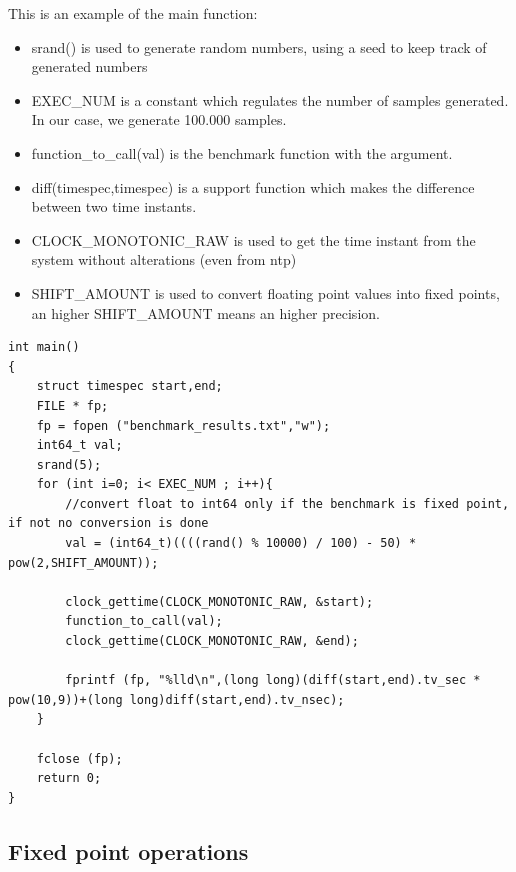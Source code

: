 This is an example of the main function:
\begin{itemize}
	\item srand() is used to generate random numbers, using a seed to keep track of generated numbers
	\item EXEC\_NUM is a constant which regulates the number of samples generated. In our case, we generate 100.000 samples.
	\item function\_to\_call(val) is the benchmark function with the argument.
	\item diff(timespec,timespec) is a support function which makes the difference between two time instants.
	\item CLOCK\_MONOTONIC\_RAW is used to get the time instant from the system without alterations (even from ntp)
	\item SHIFT\_AMOUNT is used to convert floating point values into fixed points, an higher SHIFT\_AMOUNT means an higher precision.
\end{itemize}
\begin{lstlisting}
int main()
{
	struct timespec start,end;
	FILE * fp;
	fp = fopen ("benchmark_results.txt","w");
	int64_t val;
	srand(5);
	for (int i=0; i< EXEC_NUM ; i++){
		//convert float to int64 only if the benchmark is fixed point, if not no conversion is done
		val = (int64_t)((((rand() % 10000) / 100) - 50) * pow(2,SHIFT_AMOUNT));
		
		clock_gettime(CLOCK_MONOTONIC_RAW, &start);
		function_to_call(val);
		clock_gettime(CLOCK_MONOTONIC_RAW, &end);
		
		fprintf (fp, "%lld\n",(long long)(diff(start,end).tv_sec * pow(10,9))+(long long)diff(start,end).tv_nsec);
	}
	
	fclose (fp);
	return 0;
}
\end{lstlisting}

\subsection{Fixed point operations}

